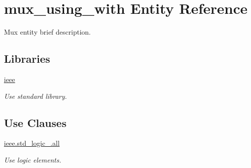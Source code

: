 \hypertarget{classmux__using__with}{\section{mux\-\_\-using\-\_\-with Entity Reference}
\label{classmux__using__with}
}


Mux entity brief description.  


\subsection*{Libraries}
 \begin{DoxyCompactItemize}
\item 
\hypertarget{classmux__using__with_a44d1d60c58066d98a072e90b31c9d908}{\hyperlink{classmux__using__with_a44d1d60c58066d98a072e90b31c9d908}{ieee} }\label{classmux__using__with_a44d1d60c58066d98a072e90b31c9d908}

\begin{DoxyCompactList}\small\item\em Use standard library. \end{DoxyCompactList}\end{DoxyCompactItemize}
\subsection*{Use Clauses}
 \begin{DoxyCompactItemize}
\item 
\hypertarget{classmux__using__with_a4678c5f677925aeb581d50504debaa44}{\hyperlink{classmux__using__with_a4678c5f677925aeb581d50504debaa44}{ieee.\-std\-\_\-logic\-\_.\-all}   }\label{classmux__using__with_a4678c5f677925aeb581d50504debaa44}

\begin{DoxyCompactList}\small\item\em Use logic elements. \end{DoxyCompactList}\end{DoxyCompactItemize}
